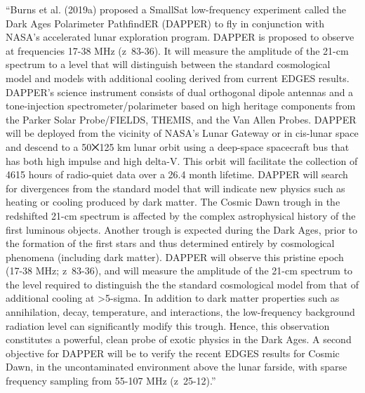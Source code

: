 “Burns et al. (2019a) proposed a SmallSat low-frequency experiment called the Dark Ages Polarimeter PathfindER (DAPPER) to fly in conjunction with NASA's accelerated lunar exploration program. DAPPER is proposed to observe at frequencies 17-38 MHz (z~83-36). It will measure the amplitude of the 21-cm spectrum to a level that will distinguish between the standard cosmological model and models with additional cooling derived from current EDGES results. DAPPER’s science instrument consists of dual orthogonal dipole antennas and a tone-injection spectrometer/polarimeter based on high heritage components from the Parker Solar Probe/FIELDS, THEMIS, and the Van Allen Probes. DAPPER will be deployed from the vicinity of NASA’s Lunar Gateway or in cis-lunar space and descend to a 50⨉125 km lunar orbit using a deep-space spacecraft bus that has both high impulse and high delta-V. This orbit will facilitate the collection of 4615 hours of radio-quiet data over a 26.4 month lifetime. DAPPER will search for divergences from the standard model that will indicate new physics such as heating or cooling produced by dark matter. The Cosmic Dawn trough in the redshifted 21-cm spectrum is affected by the complex astrophysical history of the first luminous objects. Another trough is expected during the Dark Ages, prior to the formation of the first stars and thus determined entirely by cosmological phenomena (including dark matter). DAPPER will observe this pristine epoch (17-38 MHz; z~83-36), and will measure the amplitude of the 21-cm spectrum to the level required to distinguish the the standard cosmological model from that of additional cooling at >5-sigma. In addition to dark matter properties such as annihilation, decay, temperature, and interactions, the low-frequency background radiation level can significantly modify this trough. Hence, this observation constitutes a powerful, clean probe of exotic physics in the Dark Ages. A second objective for DAPPER will be to verify the recent EDGES results for Cosmic Dawn, in the uncontaminated environment above the lunar farside, with sparse frequency sampling from 55-107 MHz (z~25-12).”
